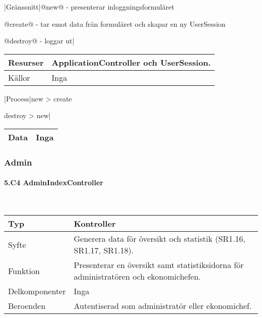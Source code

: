 \documentclass[a4paper, twoside, 11pt, titlepage]{article}
\begin{document}
			|Gränssnitt|@new@ - presenterar inloggningsformuläret

			@create@ - tar emot data från formuläret och skapar en ny UserSession

			@destroy@ - loggar ut|

			\begin {table} [ht] \begin{tabular} {  p{3.5cm} p{9.6cm} }
				\hline
				Resurser & ApplicationController och UserSession.  \\
				\hline
				Källor & Inga  \\
				\hline
			\end{tabular} \end{table} \FloatBarrier
			\vspace{6mm}

			|Process|new > create

			destroy > new|

			\begin {table} [ht] \begin{tabular} {  p{3.5cm} p{9.6cm} }
				\hline
				Data & Inga  \\
				\hline
			\end{tabular} \end{table} \FloatBarrier


		\subsubsection{Admin}



			\paragraph{5.C4 AdminIndexController}\

			\begin {table} [ht] \begin{tabular} {  p{3.5cm} p{9.6cm} }
				\hline
				Typ & Kontroller  \\
				\hline
				Syfte & Generera data för översikt och statistik (SR1.16, SR1.17, SR1.18).  \\
				\hline
				Funktion & Presenterar en översikt samt statistiksidorna för administratören och ekonomichefen.  \\
				\hline
				Delkomponenter & Inga  \\
				\hline
				Beroenden & Autentiserad som administratör eller ekonomichef.  \\
				\hline
			\end{tabular} \end{table} \FloatBarrier
			\vspace{6mm}
\end{document}
